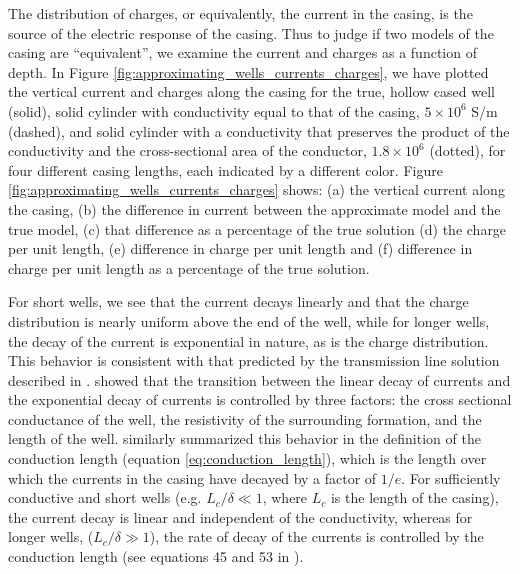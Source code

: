 The distribution of charges, or equivalently, the current in the casing, is the source of the electric response of the casing. Thus to judge if two models of the casing are ``equivalent'', we examine the current and charges as a function of depth. In Figure \ref{fig:approximating_wells_currents_charges}, we have plotted the vertical current and charges along the casing for the true, hollow cased well (solid), solid cylinder with conductivity equal to that of the casing, $5 \times 10^6$ S/m (dashed), and solid cylinder with a conductivity that preserves the product of the conductivity and the cross-sectional area of the conductor, $1.8 \times 10^6$ (dotted), for four different casing lengths, each indicated by a different color. Figure \ref{fig:approximating_wells_currents_charges} shows: (a) the vertical current along the casing, (b) the difference in current between the approximate model and the true model, (c) that difference as a percentage of the true solution (d) the charge per unit length, (e) difference in charge per unit length and (f) difference in charge per unit length as a percentage of the true solution.




For short wells, we see that the current decays linearly and that the charge distribution is nearly uniform above the end of the well, while for longer wells, the decay of the current is exponential in nature, as is the charge distribution. This behavior is consistent with that predicted by the transmission line solution described in \cite{Kaufman1993}. \cite{Kaufman1993} showed that the transition between the linear decay of currents and the exponential decay of currents is controlled by three factors: the cross sectional conductance of the well, the resistivity of the surrounding formation, and the length of the well. \cite{Schenkel1991} similarly summarized this behavior in the definition of the conduction length (equation \ref{eq:conduction_length}), which is the length over which the currents in the casing have decayed by a factor of $1/e$. For sufficiently conductive and short wells (e.g. $L_c / \delta \ll 1$, where $L_c$ is the length of the casing), the current decay is linear and independent of the conductivity, whereas for longer wells, ($L_c / \delta \gg 1$), the rate of decay of the currents is controlled by the conduction length (see equations 45 and 53 in \cite{Kaufman1993}).

